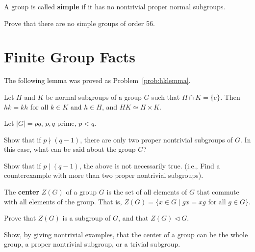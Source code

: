 \begin{definition}
 A group is called \textbf{simple} if it has no nontrivial proper normal subgroups.
\end{definition}

\begin{problem}
Prove that there are no simple groups of order 56.
\end{problem}

\section{Finite Group Facts}

The following lemma was proved as Problem~\ref{prob:hklemma}.

\begin{lemma}\label{lemma:hklemma}
 Let $H$ and $K$ be normal subgroups of a group $G$ such that $H\cap K = \{e\}$. Then $hk = kh$ for all $k\in K$ and $h\in H$, and $HK \simeq H\times K$.
\end{lemma}

\begin{problem}
Let $\lvert G \rvert = pq$, $p,q$ prime, $p<q$.
\begin{problemparts}
 \item Show that if $p \nmid (q-1)$, there are only two proper nontrivial subgroups of $G$.  In this case, what can be said about the group $G$?
 \item Show that if $p \mid (q-1)$, the above is not necessarily true. (i.e., Find a counterexample with more than two proper nontrivial subgroups).
\end{problemparts}
\end{problem}

\begin{definition}
 The \textbf{center} $Z(G)$ of a group $G$ is the set of all elements of $G$ that commute with all elements of the group.  That is, $Z(G) = \{ x \in G \mid gx = xg \mbox{ for all } g \in G \}$.
\end{definition}

\begin{problem}
Prove that $Z(G)$ is a subgroup of $G$, and that $Z(G)\lhd G$.
\end{problem}

\begin{problem}
Show, by giving nontrivial examples, that the center of a group can be the whole group, a proper nontrivial subgroup, or a trivial subgroup.
\begin{annotation}
\end{annotation}
\end{problem}

